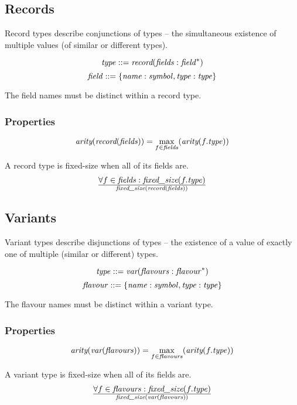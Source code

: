 \documentclass[a4paper]{report}
\newcommand\arity{{\ensuremath\textit{arity}}}
\newcommand\fixedsize{{\ensuremath\textit{fixed\_size}}}
\newcommand\tyVar{{\ensuremath\textit{var}}}
\newcommand\tyRecord{{\ensuremath\textit{record}}}
\begin{document}
\subsection{Records}
Record types describe conjunctions of types -- the simultaneous
existence of multiple values (of similar or different types).

$$\it type ::= \tyRecord(fields : field^*)$$
$$\it field ::= \{name:symbol, type:type\}$$

The field names must be distinct within a record type.

\subsubsection*{Properties}

$$
\arity(\tyRecord({\it fields})) = \max_{f \in {\it fields}}(\arity(f.{\it type}))
$$


A record type is fixed-size when all of its fields are.
$${\forall f \in {\it fields} : \fixedsize(f.{\it type})} \over
  \fixedsize(\tyRecord({\it fields}))
$$

\subsection{Variants}
Variant types describe disjunctions of types -- the
existence of a value of exactly one of multiple (similar or different) types.

$$\it type ::= \tyVar(flavours : flavour^*)$$
$$\it flavour ::= \{name:symbol, type:type\}$$

The flavour names must be distinct within a variant type.

\subsubsection*{Properties}

$$
\arity(\tyVar({\it flavours})) = \max_{f \in {\it flavours}}(\arity(f.{\it type}))
$$


A variant type is fixed-size when all of its fields are.
$${\forall f \in {\it flavours} : \fixedsize(f.{\it type})} \over
  \fixedsize(\tyVar({\it flavours}))
$$
\end{document}
